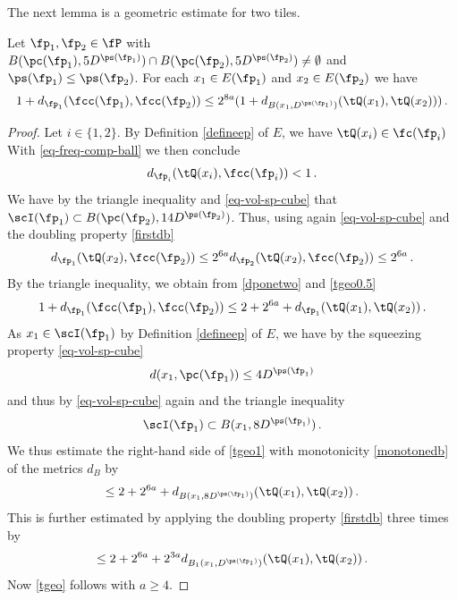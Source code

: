 The next lemma is a geometric estimate for two tiles.
\begin{lemma}\label{tile-uncertainty}
\leanok
{}
    Let $\fp_1, \fp_2\in \fP$ with
    $B(\pc(\fp_1),5D^{\ps(\fp_1)}) \cap B(\pc(\fp_2),5D^{\ps(\fp_2)}) \ne \emptyset$ and
$\ps({\fp_1})\leq \ps({\fp_2})$. For each $x_1\in E(\fp_1)$ and
$x_2\in E(\fp_2)$ we have
\begin{equation}\label{tgeo}
  1+d_{\fp_1}(\fcc(\fp_1), \fcc(\fp_2))\le
    2^{8a}(1 + d_{B(x_1, D^{\ps(\fp_1)})}(\tQ(x_1),\tQ(x_2)))\, .
\end{equation}
\end{lemma}
\begin{proof}
\leanok
Let $i\in \{1,2\}$.
By Definition \eqref{defineep} of $E$,
we have $\tQ(x_i)\in \fc(\fp_i)$
With \eqref{eq-freq-comp-ball} we then conclude
\begin{equation}\label{dponetwo}
    d_{\fp_i}(\tQ(x_i),\fcc(\fp_i)) < 1\, .
\end{equation}
We have by the triangle inequality and \eqref{eq-vol-sp-cube} that $\scI(\fp_1) \subset B(\pc(\fp_2),14D^{\ps(\fp_2)})$.
Thus, using again \eqref{eq-vol-sp-cube} and the doubling property \eqref{firstdb}
\begin{equation}\label{tgeo0.5}
    d_{\fp_1}(\tQ(x_2), \fcc(\fp_2)) \le 2^{6a} d_{\fp_2}(\tQ(x_2), \fcc(\fp_2)) \le 2^{6a}\,.
\end{equation}
By the triangle inequality, we obtain from \eqref{dponetwo} and
\eqref{tgeo0.5}
\begin{equation}\label{tgeo1}
     1+d_{\fp_1}(\fcc(\fp_1), \fcc(\fp_2))\le 2 + 2^{6a} +d_{\fp_1}(\tQ(x_1), \tQ(x_2))\, .
\end{equation}
As $x_1\in \scI(\fp_1)$ by Definition \eqref{defineep} of $E$, we have by the squeezing property \eqref{eq-vol-sp-cube}
\begin{equation}
    d(x_1,\pc(\fp_1))\le 4D^{\ps(\fp_1)}
\end{equation}
and thus by \eqref{eq-vol-sp-cube} again and the triangle inequality
\begin{equation}
    \scI(\fp_1)\subset B(x_1,8D^{\ps(\fp_1)})\, .
\end{equation}
We thus estimate the right-hand side of \eqref{tgeo1} with monotonicity \eqref{monotonedb} of the metrics $d_B$ by
\begin{equation}\label{tgeo1.5}
    \le 2 + 2^{6a} + d_{B(x_1,8D^{\ps(\fp_1)})}(\tQ(x_1), \tQ(x_2))\, .
\end{equation}
This is further estimated by applying the doubling property \eqref{firstdb} three times by
\begin{equation}\label{tgeo2}
    \le 2 + 2^{6a} +2^{3a}d_{B_1(x_1, D^{\ps(\fp_1)})}(\tQ(x_1), \tQ(x_2))\, .
\end{equation}
Now \eqref{tgeo} follows with $a\ge 4$.
\end{proof}


